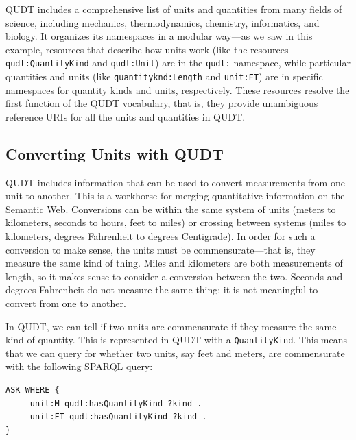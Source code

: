 QUDT includes a comprehensive list of units and quantities from many
fields of science, including mechanics, thermodynamics, chemistry,
informatics, and biology. It organizes its namespaces in a modular
way---as we saw in this example, resources that describe how units work
(like the resources \texttt{qudt:QuantityKind} and \texttt{qudt:Unit}) are in the \texttt{qudt:}
namespace, while particular quantities and units (like
\texttt{quantityknd:Length} and \texttt{unit:FT}) are in specific namespaces
for quantity kinds and units, respectively. 
These resources resolve the first function of the QUDT vocabulary, that
is, they provide unambiguous reference URIs for all the units and
quantities in QUDT.

\subsection{Converting Units with QUDT}

QUDT includes information that can be used to convert measurements from
one unit to another. This is a workhorse for merging quantitative
information on the Semantic Web. Conversions can be within the same
system of units (meters to kilometers, seconds to hours, feet to miles)
or crossing between systems (miles to kilometers, degrees Fahrenheit to
degrees Centigrade). In order for such a conversion to make sense, the
units must be commensurate---that is, they measure the same kind of
thing. Miles and kilometers are both measurements of length, so it makes
sense to consider a conversion between the two. Seconds and degrees
Fahrenheit do not measure the same thing; it is not meaningful to
convert from one to another.

In QUDT, we can tell if two units are commensurate if they measure the same
kind of quantity.  This is represented in QUDT with a \texttt{QuantityKind}.  
This means that we can query for whether two units, say feet and meters,  are commensurate with
the following SPARQL
query:

\begin{lstlisting}
ASK WHERE {
     unit:M qudt:hasQuantityKind ?kind .
     unit:FT qudt:hasQuantityKind ?kind .
}
\end{lstlisting}



